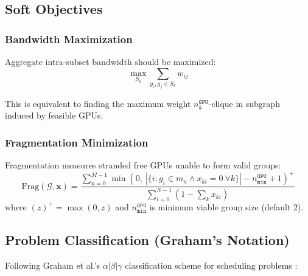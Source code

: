 \documentclass[11pt, twoside]{article}
\begin{document}
\subsection{Soft Objectives}

\subsubsection{Bandwidth Maximization}
Aggregate intra-subset bandwidth should be maximized:
\begin{equation}
\max_{S_k} \sum_{g_i,g_j \in S_k} w_{ij}
\label{eq:objective_bandwidth}
\end{equation}

This is equivalent to finding the maximum weight $n_k^{\texttt{GPU}}$-clique in subgraph induced by feasible GPUs.

\subsubsection{Fragmentation Minimization}
Fragmentation measures stranded free GPUs unable to form valid groups:
\begin{equation}
\text{Frag}(\mathcal{G}, \mathbf{x}) = \frac{\sum_{n=0}^{M-1} \min\left(0,\ |\{i : g_i \in m_n \land x_{ki}=0\ \forall k\}| - n_{\texttt{min}}^{\texttt{GPU}} + 1\right)^+}{\sum_{i=0}^{N-1} (1 - \sum_k x_{ki})}
\label{eq:fragmentation_metric}
\end{equation}
where $(z)^+ = \max(0,z)$ and $n_{\texttt{min}}^{\texttt{GPU}}$ is minimum viable group size (default 2).

\subsection{Problem Classification (Graham's Notation)}

Following Graham et al.'s $\alpha|\beta|\gamma$ classification scheme for scheduling problems \cite{naderi2023,filippi2022}:
\end{document}
